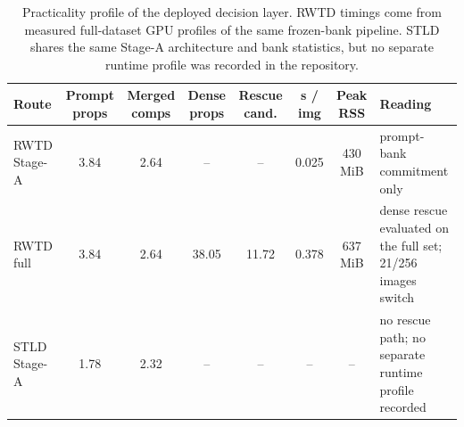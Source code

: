\begin{table}[t]
\centering
\scriptsize
\setlength{\tabcolsep}{3pt}
\renewcommand{\arraystretch}{0.98}
\begin{tabularx}{\textwidth}{@{}p{}ccccccX@{}}
\toprule
Route & Prompt props & Merged comps & Dense props & Rescue cand. & s / img & Peak RSS & Reading \\
\midrule
RWTD Stage-A & 3.84 & 2.64 & -- & -- & 0.025 & 430 MiB & prompt-bank commitment only \\
RWTD full & 3.84 & 2.64 & 38.05 & 11.72 & 0.378 & 637 MiB & dense rescue evaluated on the full set; 21/256 images switch \\
STLD Stage-A & 1.78 & 2.32 & -- & -- & -- & -- & no rescue path; no separate runtime profile recorded \\
\bottomrule
\end{tabularx}
\caption{Practicality profile of the deployed decision layer. RWTD timings come from measured full-dataset GPU profiles of the same frozen-bank pipeline. STLD shares the same Stage-A architecture and bank statistics, but no separate runtime profile was recorded in the repository.}
\label{tab:practicality}
\end{table}
